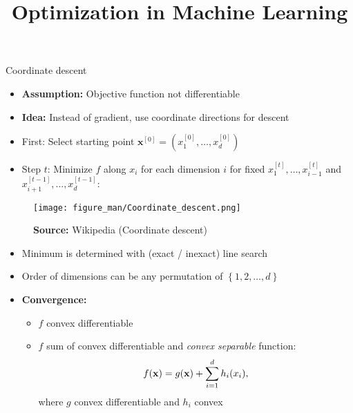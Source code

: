 \documentclass[11pt,compress,t,notes=noshow, xcolor=table]{beamer}
\title{Optimization in Machine Learning}
\date{}
\begin{document}
\lecture{\inserttitle}
\sloppy


\begin{vbframe}{Coordinate descent}

\begin{itemize}
    \item \textbf{Assumption:} Objective function not differentiable
    \item \textbf{Idea:} Instead of gradient, use coordinate directions for descent
\end{itemize}


\begin{itemize}
\item First: Select starting point $\bm{x}^{[0]} = (x^{[0]}_1, \ldots, x^{[0]}_d)$
\item Step $t$: Minimize $f$ along $x_i$ for each dimension $i$ for fixed $x^{[t]}_1, \ldots,x^{[t]}_{i-1}$ and $x^{[t-1]}_{i+1}, \ldots,x^{[t-1]}_d$:
\end{itemize}

\vspace{-0.5\baselineskip}

\begin{figure}
    \centering
    \texttt{[image: figure\_man/Coordinate\_descent.png]}
    \caption*{\small \textbf{Source:} Wikipedia (Coordinate descent)}
\end{figure}

\framebreak

\begin{itemize}
    \item Minimum is determined with (exact / inexact) line search
    \item Order of dimensions can be any permutation of $\left\{1,2,\ldots,d\right\}$
    \item \textbf{Convergence:}
        \begin{itemize}
            \item $f$ convex differentiable
            \item $f$ sum of convex differentiable and \textit{convex separable} function:
                \begin{equation*}
                    f(\mathbf{x}) = g(\mathbf{x}) + \sum_{i=1}^d h_i(x_i),
                \end{equation*}
                where $g$ convex differentiable and $h_i$ convex
        \end{itemize}
\end{itemize}


\end{vbframe}
\end{document}

